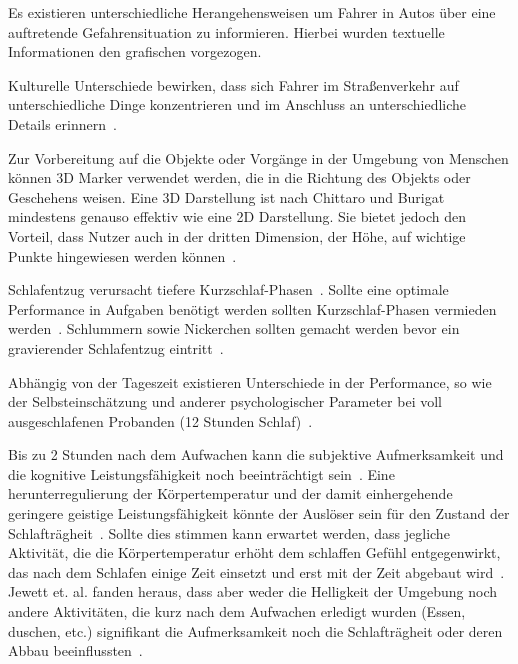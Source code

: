 \documentclass[a4paper, 11pt]{article}
\begin{document}
Es existieren unterschiedliche Herangehensweisen um Fahrer in Autos über eine auftretende Gefahrensituation zu informieren. Hierbei wurden textuelle Informationen den grafischen vorgezogen.~\cite{green1995hazard}

Kulturelle Unterschiede bewirken, dass sich Fahrer im Straßenverkehr auf unterschiedliche Dinge konzentrieren und im Anschluss an unterschiedliche Details erinnern~\cite{yumiko2017VisAttention}.

Zur Vorbereitung auf die Objekte oder Vorgänge in der Umgebung von Menschen können 3D Marker verwendet werden, die in die Richtung des Objekts oder Geschehens weisen. Eine 3D Darstellung ist nach Chittaro und Burigat mindestens genauso effektiv wie eine 2D Darstellung. Sie bietet jedoch den Vorteil, dass Nutzer auch in der dritten Dimension, der Höhe, auf wichtige Punkte hingewiesen werden können~\cite{chittaro20043d}.

Schlafentzug verursacht tiefere Kurzschlaf-Phasen~\cite{dinges1985assessing}. Sollte eine optimale Performance in Aufgaben benötigt werden sollten Kurzschlaf-Phasen vermieden werden~\cite{dinges1985assessing}. Schlummern sowie Nickerchen sollten gemacht werden bevor ein gravierender Schlafentzug eintritt~\cite{dinges1985assessing}.

Abhängig von der Tageszeit existieren Unterschiede in der Performance, so wie der Selbsteinschätzung und anderer psychologischer Parameter bei voll ausgeschlafenen Probanden (12 Stunden Schlaf)~\cite{kraemer2000time}.

Bis zu 2 Stunden nach dem Aufwachen kann die subjektive Aufmerksamkeit und die kognitive Leistungsfähigkeit noch beeinträchtigt sein~\cite{jewett1999time}. Eine herunterregulierung der Körpertemperatur und der damit einhergehende geringere geistige Leistungsfähigkeit könnte der Auslöser sein für den Zustand der Schlafträgheit~\cite{dinges1990you}. Sollte dies stimmen kann erwartet werden, dass jegliche Aktivität, die die Körpertemperatur erhöht dem schlaffen Gefühl entgegenwirkt, das nach dem Schlafen einige Zeit einsetzt und erst mit der Zeit abgebaut wird~\cite{jewett1999time}. Jewett et. al. fanden heraus, dass aber weder die Helligkeit der Umgebung noch andere Aktivitäten, die kurz nach dem Aufwachen erledigt wurden (Essen, duschen, etc.) signifikant die Aufmerksamkeit noch die Schlafträgheit oder deren Abbau beeinflussten~\cite{jewett1999time}.
\end{document}

